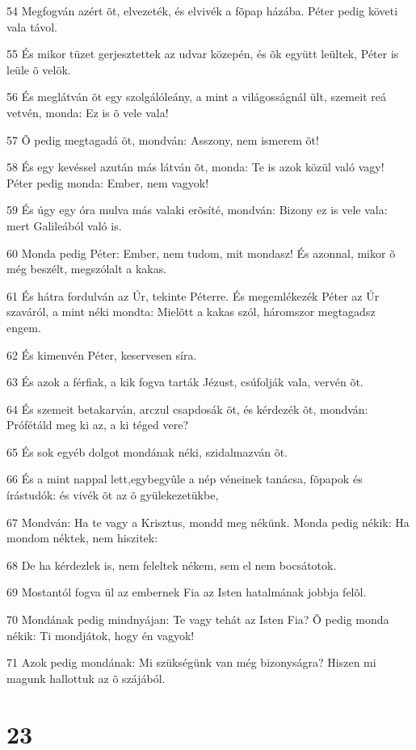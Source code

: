 \par 54 Megfogván azért õt, elvezeték, és elvivék a fõpap házába. Péter pedig követi vala távol.
\par 55 És mikor tüzet gerjesztettek az udvar közepén, és õk együtt leültek, Péter is leüle õ velök.
\par 56 És meglátván õt egy szolgálóleány, a mint a világosságnál ült, szemeit reá vetvén, monda: Ez is õ vele vala!
\par 57 Õ pedig megtagadá õt, mondván: Asszony, nem ismerem õt!
\par 58 És egy kevéssel azután más látván õt, monda: Te is azok közül való vagy! Péter pedig monda: Ember, nem vagyok!
\par 59 És úgy egy óra mulva más valaki erõsíté, mondván: Bizony ez is vele vala: mert Galileából való is.
\par 60 Monda pedig Péter: Ember, nem tudom, mit mondasz! És azonnal, mikor õ még beszélt, megszólalt a kakas.
\par 61 És hátra fordulván az Úr, tekinte Péterre. És megemlékezék Péter az Úr szaváról, a mint néki mondta: Mielõtt a kakas szól, háromszor megtagadsz engem.
\par 62 És kimenvén Péter, keservesen síra.
\par 63 És azok a férfiak, a kik fogva tarták Jézust, csúfolják vala, vervén  õt.
\par 64 És szemeit betakarván, arczul csapdosák õt, és kérdezék õt, mondván: Prófétáld meg ki az, a ki téged vere?
\par 65 És sok egyéb dolgot mondának néki, szidalmazván õt.
\par 66 És a mint nappal lett,egybegyûle a nép véneinek tanácsa, fõpapok és írástudók: és vivék õt az õ gyülekezetükbe,
\par 67 Mondván: Ha te vagy a Krisztus, mondd meg nékünk. Monda pedig nékik: Ha mondom néktek, nem hiszitek:
\par 68 De ha kérdezlek is, nem feleltek nékem, sem el nem bocsátotok.
\par 69 Mostantól fogva ül az embernek Fia az Isten hatalmának jobbja felõl.
\par 70 Mondának pedig mindnyájan: Te vagy tehát az Isten Fia? Õ pedig monda nékik: Ti mondjátok, hogy én vagyok!
\par 71 Azok pedig mondának: Mi szükségünk van még bizonyságra? Hiszen mi magunk hallottuk az õ szájából.

\chapter{23}

